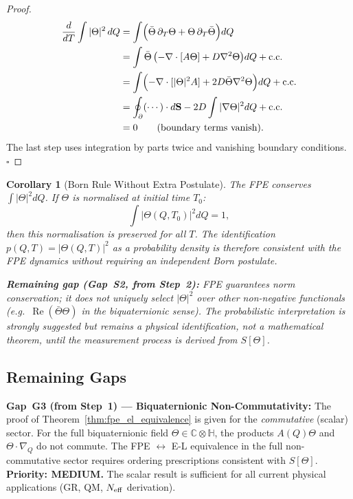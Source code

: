 \documentclass[12pt,a4paper]{article}
\newtheorem{corollary}[theorem]{Corollary}
\theoremstyle{definition}
\theoremstyle{remark}
\begin{document}
\begin{proof}
\begin{align}
  \frac{d}{dT}\int |\Theta|^2\, dQ
  &= \int \Bigl(\bar\Theta\,\partial_T\Theta + \Theta\,\partial_T\bar\Theta\Bigr) dQ \notag\\
  &= \int \bar\Theta\,\bigl(-\nabla\cdot[A\Theta] + D\nabla^2\Theta\bigr) dQ
     + \mathrm{c.c.} \notag\\
  &= \int \Bigl(-\nabla\cdot[|\Theta|^2 A] + 2D\bar\Theta\nabla^2\Theta\Bigr) dQ
     + \mathrm{c.c.} \notag\\
  &= \oint_{\partial} (\cdots)\cdot d\mathbf{S}
     - 2D\int |\nabla\Theta|^2 dQ
     + \mathrm{c.c.} \notag\\
  &= 0 \qquad \text{(boundary terms vanish)}.
\end{align}
The last step uses integration by parts twice and vanishing boundary conditions. $\square$
\end{proof}

\begin{corollary}[Born Rule Without Extra Postulate]
\label{cor:born}
The FPE conserves $\int|\Theta|^2 dQ$.  If $\Theta$ is normalised at
initial time $T_0$:
\[
  \int |\Theta(Q,T_0)|^2 dQ = 1,
\]
then this normalisation is preserved for all $T$.
The identification $p(Q,T) = |\Theta(Q,T)|^2$ as a probability density
is therefore \emph{consistent} with the FPE dynamics without requiring
an independent Born postulate.

\begin{gapbox}
\textbf{Remaining gap (Gap~S2, from Step~2):}
FPE guarantees norm conservation; it does not uniquely select
$|\Theta|^2$ over other non-negative functionals (e.g.\ $\operatorname{Re}(\bar\Theta\Theta)$
in the biquaternionic sense).  The probabilistic interpretation is
strongly suggested but remains a physical identification, not a
mathematical theorem, until the measurement process is derived from
$S[\Theta]$.
\end{gapbox}
\end{corollary}

\subsection{Remaining Gaps}
\label{subsec:gaps}

\begin{gapbox}
\textbf{Gap~G3 (from Step~1) --- Biquaternionic Non-Commutativity:}
The proof of Theorem~\ref{thm:fpe_el_equivalence} is given for the
\emph{commutative} (scalar) sector.  For the full biquaternionic field
$\Theta \in \mathbb{C}\otimes\mathbb{H}$, the products $A(Q)\Theta$ and
$\Theta\cdot\nabla_Q$ do not commute.  The FPE $\leftrightarrow$ E-L
equivalence in the full non-commutative sector requires ordering
prescriptions consistent with $S[\Theta]$.
\textbf{Priority: MEDIUM.}  The scalar result is sufficient for all
current physical applications (GR, QM, $N_{\rm eff}$ derivation).
\end{gapbox}
\end{document}
